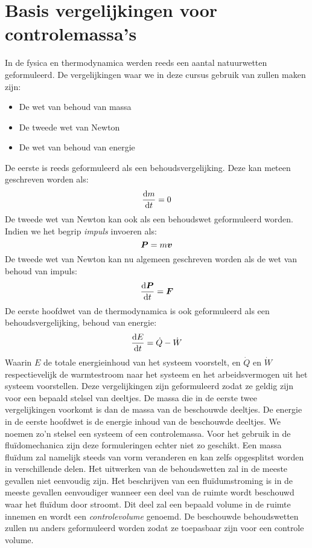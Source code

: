 	\section{Basis vergelijkingen voor controlemassa's}
	\label{sec:Basis vergelijkingen voor controlemassa's}
In de fysica en thermodynamica werden reeds een aantal natuurwetten geformuleerd. De vergelijkingen waar we in deze cursus gebruik van zullen maken zijn:
\begin{itemize}
	\item De wet van behoud van massa
	\item De tweede wet van Newton
	\item De wet van behoud van energie
\end{itemize}
De eerste is reeds geformuleerd als een behoudsvergelijking. Deze kan meteen geschreven worden als:
\begin{equation}
	\frac{\mathrm{d} m}{\mathrm{d} t} = 0
	\label{eqn:controlemasse,behoud van massa}
\end{equation}
De tweede wet van Newton kan ook als een behoudswet geformuleerd worden. Indien we het begrip \emph{impuls} invoeren als:
\begin{equation}
	\boldsymbol{P} = m\boldsymbol{v}
	\label{eqn:impuls}
\end{equation}
De tweede wet van Newton kan nu algemeen geschreven worden als de wet van behoud van impuls:
\begin{equation}
	\frac{\mathrm{d} \boldsymbol{P}}{\mathrm{d} t} = \boldsymbol{F}
	\label{eqn:controlemasse,behoud van impuls}
\end{equation}
De eerste hoofdwet van de thermodynamica is ook geformuleerd als een behoudsvergelijking, behoud van energie:
\begin{equation}
	\frac{\mathrm{d} E}{\mathrm{d} t} = \dot{Q}-\dot{W}
	\label{eqn:controlemasse,behoud van energie}
\end{equation}
Waarin $E$ de totale energieinhoud van het systeem voorstelt, en $\dot{Q}$ en $\dot{W}$ respectievelijk de warmtestroom naar het systeem en het arbeidsvermogen uit het systeem voorstellen.
\npar
Deze vergelijkingen zijn geformuleerd zodat ze geldig zijn voor een bepaald stelsel van deeltjes. 
De massa die in de eerste twee vergelijkingen voorkomt is dan de massa van de beschouwde deeltjes. De energie in de eerste hoofdwet is de energie inhoud van de beschouwde deeltjes. We noemen zo'n stelsel een systeem of een controlemassa.
\npar
Voor het gebruik in de flu\"idomechanica zijn deze formuleringen echter niet zo geschikt. Een massa flu\"idum zal namelijk steeds van vorm veranderen en kan zelfs opgesplitst worden in verschillende delen. Het uitwerken van de behoudswetten zal in de meeste gevallen niet eenvoudig zijn.
\npar
Het beschrijven van een flu\"idumstroming is in de meeste gevallen eenvoudiger wanneer een deel van de ruimte wordt beschouwd waar het flu\"idum door stroomt. Dit deel zal een bepaald volume in de ruimte innemen en wordt een \emph{controlevolume} genoemd.
\npar
De beschouwde behoudswetten zullen nu anders geformuleerd worden zodat ze toepasbaar zijn voor een controle volume.
	\FloatBarrier
